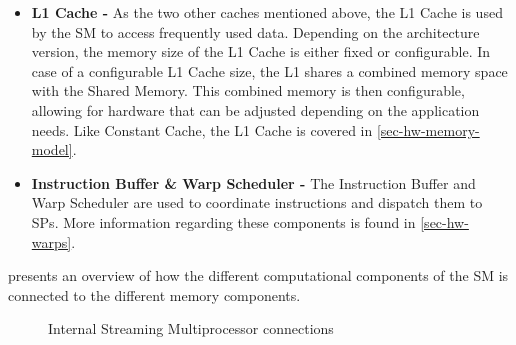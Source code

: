 \begin{itemize}
	
	\item \textbf{L1 Cache -} As the two other caches mentioned above, the L1 Cache is used by the SM to access frequently used data. 
	Depending on the architecture version, the memory size of the L1 Cache is either fixed or configurable.
	In case of a configurable L1 Cache size, the L1 shares a combined memory space with the Shared Memory.
	This combined memory is then configurable, allowing for hardware that can be adjusted depending on the application needs. Like Constant Cache, the L1 Cache is covered in \cref{sec-hw-memory-model}.

	\item  \textbf{Instruction Buffer \& Warp Scheduler -} The Instruction Buffer and Warp Scheduler are used to coordinate instructions and dispatch them to SPs.
	More information regarding these components is found in \cref{sec-hw-warps}.
		
\end{itemize}

 presents an overview of how the different computational components of the SM is connected to the different memory components.

\begin{figure}[H]
	\centering
	\caption{Internal Streaming Multiprocessor connections}
	\label{fig:hw-sm-inside}
\end{figure}







